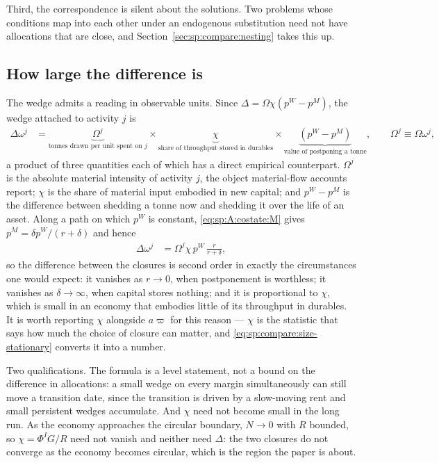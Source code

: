 Third, the correspondence is silent about the solutions. Two problems whose conditions map into each
other under an endogenous substitution need not have allocations that are close, and
Section~\ref{sec:sp:compare:nesting} takes this up.


\subsection{How large the difference is}\label{sec:sp:compare:size}

The wedge admits a reading in observable units. Since $\Delta=\Omega\chi\left(p^W-p^M\right)$, the
wedge attached to activity $j$ is
\begin{align}
\Delta\omega^j &= \underbrace{\Omega^j}_{\text{tonnes drawn per unit spent on }j}
\times\underbrace{\chi}_{\text{share of throughput stored in durables}}
\times\underbrace{\left(p^W-p^M\right)}_{\text{value of postponing a tonne}},
\qquad
\Omega^j\equiv\Omega\omega^j,
\label{eq:sp:compare:size}
\end{align}
a product of three quantities each of which has a direct empirical counterpart. $\Omega^j$ is the
absolute material intensity of activity $j$, the object material-flow accounts report; $\chi$ is the
share of material input embodied in new capital; and $p^W-p^M$ is the difference between shedding a
tonne now and shedding it over the life of an asset. Along a path on which $p^W$ is constant,
\eqref{eq:sp:A:costate:M} gives $p^M=\delta p^W/\left(r+\delta\right)$ and hence
\begin{align}
\Delta\omega^j &= \Omega^j\chi\,p^W\,\frac{r}{r+\delta},
\label{eq:sp:compare:size-stationary}
\end{align}
so the difference between the closures is second order in exactly the circumstances one would expect:
it vanishes as $r\to0$, when postponement is worthless; it vanishes as $\delta\to\infty$, when capital
stores nothing; and it is proportional to $\chi$, which is small in an economy that embodies little of
its throughput in durables. It is worth reporting $\chi$ alongside $a\varpi$ for this reason ---
$\chi$ is the statistic that says how much the choice of closure can matter, and
\eqref{eq:sp:compare:size-stationary} converts it into a number.

Two qualifications. The formula is a level statement, not a bound on the difference in allocations: a
small wedge on every margin simultaneously can still move a transition date, since the transition is
driven by a slow-moving rent and small persistent wedges accumulate. And $\chi$ need not become small
in the long run. As the economy approaches the circular boundary, $N\to0$ with $R$ bounded, so
$\chi=\Phi^IG/R$ need not vanish and neither need $\Delta$: the two closures do not converge as the
economy becomes circular, which is the region the paper is about.


